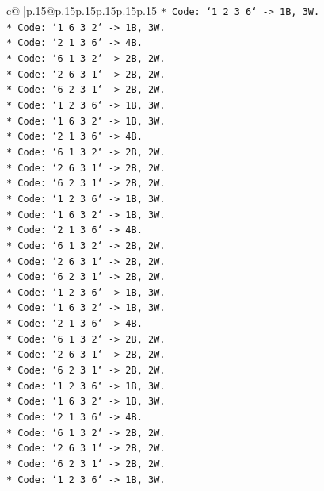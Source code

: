 \documentclass{article}
\begin{document}
{\begin{supertabular}{c@{$\;$}|p{.15\linewidth}@{}p{.15\linewidth}p{.15\linewidth}p{.15\linewidth}p{.15\linewidth}p{.15\linewidth}}
{{{\texttt{*   Code: `1 2 3 6` {-}> 1B, 3W.} \\
\texttt{*   Code: `1 6 3 2` {-}> 1B, 3W.} \\
\texttt{*   Code: `2 1 3 6` {-}> 4B.} \\
\texttt{*   Code: `6 1 3 2` {-}> 2B, 2W.} \\
\texttt{*   Code: `2 6 3 1` {-}> 2B, 2W.} \\
\texttt{*   Code: `6 2 3 1` {-}> 2B, 2W.} \\
\texttt{*   Code: `1 2 3 6` {-}> 1B, 3W.} \\
\texttt{*   Code: `1 6 3 2` {-}> 1B, 3W.} \\
\texttt{*   Code: `2 1 3 6` {-}> 4B.} \\
\texttt{*   Code: `6 1 3 2` {-}> 2B, 2W.} \\
\texttt{*   Code: `2 6 3 1` {-}> 2B, 2W.} \\
\texttt{*   Code: `6 2 3 1` {-}> 2B, 2W.} \\
\texttt{*   Code: `1 2 3 6` {-}> 1B, 3W.} \\
\texttt{*   Code: `1 6 3 2` {-}> 1B, 3W.} \\
\texttt{*   Code: `2 1 3 6` {-}> 4B.} \\
\texttt{*   Code: `6 1 3 2` {-}> 2B, 2W.} \\
\texttt{*   Code: `2 6 3 1` {-}> 2B, 2W.} \\
\texttt{*   Code: `6 2 3 1` {-}> 2B, 2W.} \\
\texttt{*   Code: `1 2 3 6` {-}> 1B, 3W.} \\
\texttt{*   Code: `1 6 3 2` {-}> 1B, 3W.} \\
\texttt{*   Code: `2 1 3 6` {-}> 4B.} \\
\texttt{*   Code: `6 1 3 2` {-}> 2B, 2W.} \\
\texttt{*   Code: `2 6 3 1` {-}> 2B, 2W.} \\
\texttt{*   Code: `6 2 3 1` {-}> 2B, 2W.} \\
\texttt{*   Code: `1 2 3 6` {-}> 1B, 3W.} \\
\texttt{*   Code: `1 6 3 2` {-}> 1B, 3W.} \\
\texttt{*   Code: `2 1 3 6` {-}> 4B.} \\
\texttt{*   Code: `6 1 3 2` {-}> 2B, 2W.} \\
\texttt{*   Code: `2 6 3 1` {-}> 2B, 2W.} \\
\texttt{*   Code: `6 2 3 1` {-}> 2B, 2W.} \\
\texttt{*   Code: `1 2 3 6` {-}> 1B, 3W.} \\
}}}
\end{supertabular}}
\end{document}
